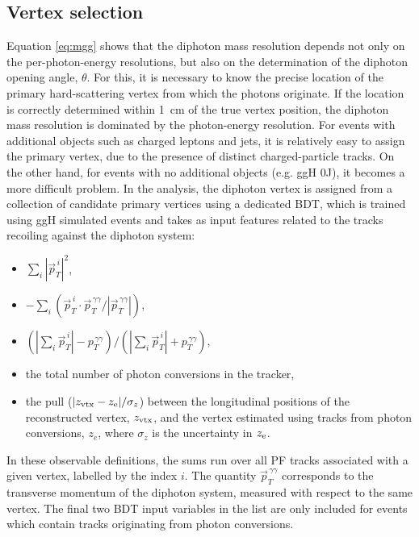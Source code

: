 \subsection{Vertex selection}\label{sec:vertex_selection}
Equation \ref{eq:mgg} shows that the diphoton mass resolution depends not only on the per-photon-energy resolutions, but also on the determination of the diphoton opening angle, $\theta$. For this, it is necessary to know the precise location of the primary hard-scattering vertex from which the photons originate. If the location is correctly determined within 1~cm of the true vertex position, the diphoton mass resolution is dominated by the photon-energy resolution. For events with additional objects such as charged leptons and jets, it is relatively easy to assign the primary vertex, due to the presence of distinct charged-particle tracks. On the other hand, for \Hgg events with no additional objects (e.g. ggH 0J), it becomes a more difficult problem. In the \Hgg analysis, the diphoton vertex is assigned from a collection of candidate primary vertices using a dedicated BDT, which is trained using ggH \Hgg simulated events and takes as input features related to the tracks recoiling against the diphoton system:

\begin{itemize}
    \item $\sum_i |\vec{p}^{\,i}_T|^2$,
    \item $-\sum_i (\vec{p}^{\,i}_T\cdot \vec{p}_T^{\,\gamma\gamma}/|\vec{p}_T^{\,\gamma\gamma}|)$,
    \item $(|\sum_i \vec{p}^{\,i}_T| - p_T^{\,\gamma\gamma})/(|\sum_i \vec{p}^{\,i}_T| + p_T^{\,\gamma\gamma})$,
    \item the total number of photon conversions in the tracker,
    \item the pull ($|z_{\rm{vtx}}-z_{\rm{e}}|/\sigma_z$) between the longitudinal positions of the reconstructed vertex, $z_{\rm{vtx}}$, and the vertex estimated using tracks from photon conversions, $z_e$, where $\sigma_z$ is the uncertainty in $z_{\rm{e}}$.
\end{itemize}

\noindent
In these observable definitions, the sums run over all PF tracks associated with a given vertex, labelled by the index $i$. The quantity $\vec{p}_T^{\,\gamma\gamma}$ corresponds to the transverse momentum of the diphoton system, measured with respect to the same vertex. The final two BDT input variables in the list are only included for events which contain tracks originating from photon conversions. 

